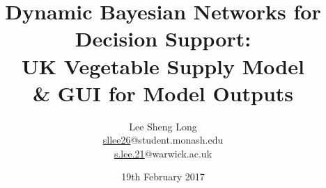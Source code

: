 \documentclass[12pt,notitlepage]{article}
\title{Dynamic Bayesian Networks for Decision Support: \\UK Vegetable Supply Model\\\& GUI for Model Outputs}
\author{Lee Sheng Long\\
\href{mailto:sllee26@student.monash.edu}{sllee26}@student.monash.edu\\
\href{mailto:s.lee.21@warwick.ac.uk}{s.lee.21}@warwick.ac.uk
}
\begin{document}
\date{19th February 2017}
\maketitle

\begin{abstract}

\end{abstract}

\begin{multicols*}{2}
\tableofcontents
\end{multicols*}

\clearpage
\restoregeometry
\setcounter{page}{1}
\pagestyle{fancy}
\begin{multicols}{2}
\end{multicols}
\printbibliography

\clearpage
{}
\appendix
\appendixpage
\addappheadtotoc
\end{document}
